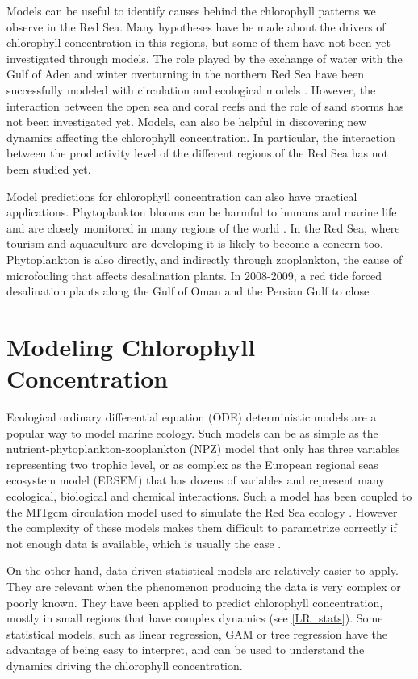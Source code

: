 Models can be useful to identify causes behind the chlorophyll patterns we observe in the Red Sea. Many hypotheses have be made about the drivers of chlorophyll concentration in this regions, but some of them have not been yet investigated through models. The role played by the exchange of water with the Gulf of Aden and winter overturning in the northern Red Sea have been successfully modeled with circulation and ecological models \cite{Triantafyllou2014}. However, the interaction between the open sea and coral reefs and the role of sand storms has not been investigated yet. Models, can also be helpful in discovering new dynamics affecting the chlorophyll concentration. In particular, the interaction between the productivity level of the different regions of the Red Sea has not been studied yet.

Model predictions for chlorophyll concentration can also have practical applications. Phytoplankton blooms can be harmful to humans and marine life and are closely monitored in many regions of the world \cite{Pettersson2013}. In the Red Sea, where tourism and aquaculture are developing it is likely to become a concern too. Phytoplankton is also directly, and indirectly through zooplankton, the cause of microfouling that affects desalination plants. In 2008-2009, a red tide forced desalination plants along the Gulf of Oman and the Persian Gulf to close \cite{Richlen2010}.

\section{Modeling Chlorophyll Concentration}

Ecological ordinary differential equation (ODE) deterministic models are a popular way to model marine ecology. Such models can be as simple as the nutrient-phytoplankton-zooplankton (NPZ) model that only has three variables representing two trophic level, or as complex as the European regional seas ecosystem model (ERSEM) that has dozens of variables and represent many ecological, biological and chemical interactions. Such a model has been coupled to the MITgcm circulation model used to simulate the Red Sea ecology \cite{Triantafyllou2014}. However the complexity of these models makes them difficult to parametrize correctly if not enough data is available, which is usually the case \cite{Anderson2005}.

On the other hand, data-driven statistical models are relatively easier to apply. They are relevant when the phenomenon producing the data is very complex or poorly known. They have been applied to predict chlorophyll concentration, mostly in small regions that have complex dynamics (see \ref{LR_stats}). Some statistical models, such as linear regression, GAM or tree regression have the advantage of being easy to interpret, and can be used to understand the dynamics driving the chlorophyll concentration.

